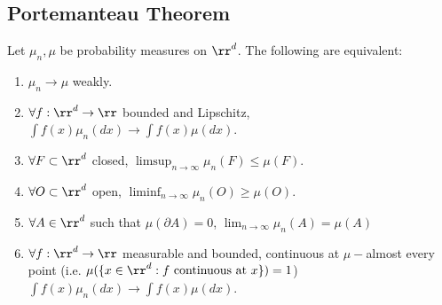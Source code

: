 \documentclass[../main.tex]{subfiles}
\begin{document}
\subsection{Portemanteau Theorem}
\begin{theorem}
  Let $\mu_n, \mu$ be probability measures on $\rr^d$. The following are
  equivalent:
  \begin{enumerate}
    \item $\mu_n \to \mu$ weakly.
    \item $\forall f: \rr^d \to \rr $ bounded and Lipschitz, $\int f(x) \mu_n(dx)
      \to \int f(x) \mu(dx)$.
    \item $\forall F \subset \rr^d$ closed, $\limsup_{n \to \infty} \mu_n(F)
      \leq \mu(F)$.
    \item $\forall O \subset \rr^d$ open, $\liminf_{n \to \infty} \mu_n(O)
      \geq \mu(O)$.
    \item $\forall A \in \rr^d$ such that $\mu(\partial A) = 0$, $\lim_{n \to
      \infty}\mu_n(A) = \mu(A)$
    \item $\forall f:\rr^d \to \rr $ measurable and bounded, continuous at
      $\mu-$almost every point (i.e. $\mu(\{ x \in \rr^d : f \text{ continuous
      at } x \}) = 1 $) $\int f(x) \mu_n(dx)
      \to \int f(x) \mu(dx)$.
  \end{enumerate}
\end{theorem}
\end{document}
